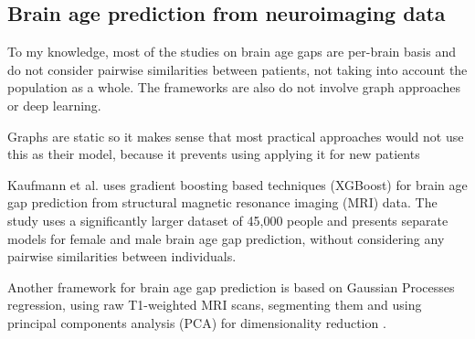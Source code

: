 \subsection{Brain age prediction from neuroimaging data}
To my knowledge, most of the studies on brain age gaps are per-brain basis and do not consider pairwise similarities between patients, not taking into account the population as a whole. The frameworks are also do not involve graph approaches or deep learning.

Graphs are static so it makes sense that most practical approaches would not use this as their model, because it prevents using applying it for new patients

Kaufmann et al. \cite{kaufmann2019} uses gradient boosting based techniques (XGBoost) \cite{chen2016xgboost} for brain age gap prediction from structural magnetic resonance imaging (MRI) data. The study uses a significantly larger dataset of 45,000 people and presents separate models for female and male brain age gap prediction, without considering any pairwise similarities between individuals.

Another framework for brain age gap prediction is based on Gaussian Processes regression, using raw T1-weighted MRI scans, segmenting them and using principal components analysis (PCA) for dimensionality reduction \cite{cole2018brain}.
